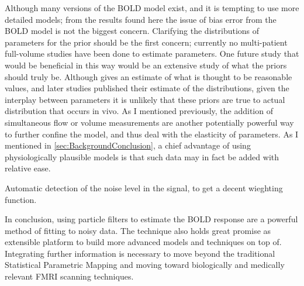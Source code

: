 Although many versions of the BOLD model exist, and it is tempting to use 
more detailed models; from the results found here the issue of bias error
from the BOLD model is not the biggest concern. Clarifying the distributions
of parameters for the prior should be the first concern; currently no multi-patient
full-volume studies have been done to estimate parameters.
One future study that would be beneficial in this way  would
be an extensive study of what the priors should truly be. Although \cite{Friston2000}
gives an estimate of what is thought to be reasonable values, and later studies
published their estimate of the distributions, given the interplay between
parameters it is unlikely that these priors are true to actual distribution
that occurs in vivo. As I mentioned previously, the addition of simultaneous
flow or volume measurements are another potentially powerful way to further confine the model,
and thus deal with the elasticity of parameters. As I mentioned in 
\autoref{sec:BackgroundConclusion}, a chief advantage of using physiologically
plausible models is that such data may in fact be added with relative ease.

Automatic detection of the noise level in the signal, to get a decent wieghting
function.

In conclusion, using particle filters to estimate the BOLD response are 
a powerful method of fitting to noisy data. The technique also
holds great promise as extensible platform to build more advanced models
and techniques on top of. Integrating further information is necessary to
move beyond the traditional Statistical Parametric Mapping and moving
toward biologically and medically relevant FMRI scanning techniques. 
